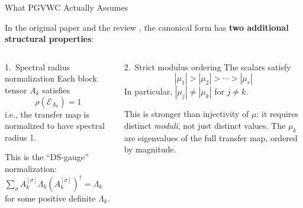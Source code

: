 \documentclass[aspectratio=169,10pt]{beamer}
\begin{document}
\begin{frame}{What PGVWC Actually Assumes}
\vspace{-0.5em}

In the original paper \cite{Perez-Garcia2007Matrix} and the review \cite{Cirac2021Matrix},
the canonical form has \textbf{two additional structural properties}:

\vspace{0.3em}
\begin{columns}[T]
\begin{block}{\small 1.\ Spectral radius normalization}
Each block tensor $A_k$ satisfies
\[
  \rho(\mathcal{E}_{A_k}) = 1
\]
i.e., the transfer map is normalized to have spectral radius 1.

\vspace{0.3em}
\textcolor{dimwhite}{\footnotesize%
This is the ``DS-gauge'' normalization:
$\sum_\sigma A_k^{[\sigma]} \Lambda_k (A_k^{[\sigma]})^\dagger = \Lambda_k$
for some positive definite $\Lambda_k$.
}
\end{block}

\begin{block}{\small 2.\ Strict modulus ordering}
The scalars satisfy
\[
  |\mu_1| > |\mu_2| > \cdots > |\mu_r|
\]
In particular, $|\mu_j| \neq |\mu_k|$ for $j \neq k$.

\vspace{0.3em}
\textcolor{dimwhite}{\footnotesize%
This is stronger than injectivity of $\mu$:
it requires distinct \emph{moduli}, not just distinct values.
The $\mu_k$ are eigenvalues of the full transfer map,
ordered by magnitude.
}
\end{block}
\end{columns}

\vspace{0.5em}
\begin{center}
\end{center}
\end{frame}
\end{document}
